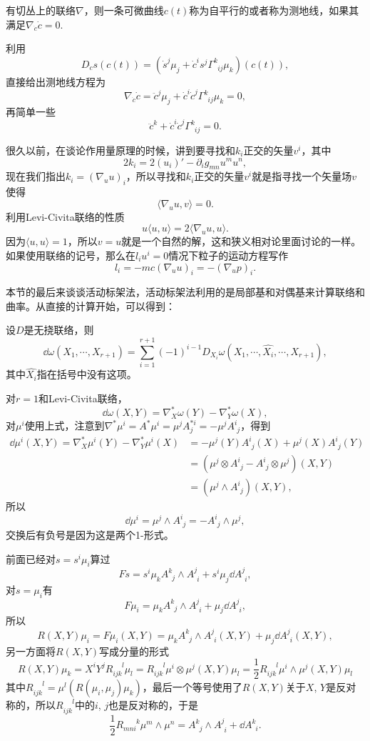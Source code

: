 \para 有切丛上的联络$\nabla$，则一条可微曲线$c(t)$称为自平行的或者称为测地线，如果其满足$\nabla_{\dot{c}}\dot{c}=0$.

利用
\[
D_{\dot{c}}s(c(t))=\left(\dot{s}^j\mu_j+\dot{c}^i s^j\Gamma^k_{\phantom{k}ij}\mu_k\right)(c(t)),
\]
直接给出测地线方程为
\[
\nabla_{\dot{c}}\dot{c}=\ddot{c}^j\mu_j+\dot{c}^i \dot{c}^j\Gamma^k_{\phantom{k}ij}\mu_k=0,
\]
再简单一些
\[
\ddot{c}^k+\dot{c}^i \dot{c}^j\Gamma^k_{\phantom{k}ij}=0.
\]

很久以前，在谈论作用量原理的时候，讲到要寻找和$k_i$正交的矢量$v^i$，其中
\[
	2k_i=2(u_i)'-\partial_ig_{mn}u^mu^n,
\]
现在我们指出$k_i=(\nabla_{u}u)_i$，所以寻找和$k_i$正交的矢量$v^i$就是指寻找一个矢量场$v$使得
\[
	\langle \nabla_{u}u,v\rangle=0.
\]
利用Levi-Civita联络的性质
\[
	u\langle u,u\rangle=2\langle \nabla_{u}u,u\rangle.
\]
因为$\langle u,u\rangle=1$，所以$v=u$就是一个自然的解，这和狭义相对论里面讨论的一样。如果使用联络的记号，那么在$l_iu^i=0$情况下粒子的运动方程写作
\[
	l_i=-mc(\nabla_{u}u)_i=-(\nabla_{u}p)_i.
\]

本节的最后来谈谈活动标架法，活动标架法利用的是局部基和对偶基来计算联络和曲率。从直接的计算开始，可以得到：

\pro 设$D$是无挠联络，则
\[
	\dd \omega(X_1,\cdots,X_{r+1})=\sum_{i=1}^{r+1}(-1)^{i-1}D_{X_i}\omega(X_1,\cdots,\hat{X_i},\cdots,X_{r+1}),
\]
其中$\hat{X_i}$指在括号中没有这项。

对$r=1$和Levi-Civita联络，
\[
	\dd \omega(X,Y)=\nabla^*_{X}\omega(Y)-\nabla^*_{Y}\omega(X),
\]
对$\mu^i$使用上式，注意到$\nabla^*\mu^i=A^*\mu^i=\mu^jA^{*i}_j=-\mu^jA^i_{\phantom{i}j}$，得到
\begin{align*}
	\dd \mu^i(X,Y)=\nabla^*_{X}\mu^i(Y)-\nabla^*_{Y}\mu^i(X)&=-\mu^j(Y)A^i_{\phantom{i}j}(X)+\mu^j(X)A^i_{\phantom{i}j}(Y)\\
	&=(\mu^j\otimes A^i_{\phantom{i}j}-A^i_{\phantom{i}j}\otimes \mu^j)(X,Y)\\
	&=(\mu^j\wedge A^i_{\phantom{i}j})(X,Y),
\end{align*}
所以
\begin{equation}
	\dd \mu^i=\mu^j\wedge A^i_{\phantom{i}j}=-A^i_{\phantom{i}j}\wedge \mu^j,
	\label{cartan1}
\end{equation}
交换后有负号是因为这是两个1-形式。

前面已经对$s=s^i\mu_i$算过
\[
	F s=s^i \mu_k A^{k}_{\phantom{k}j}\wedge A^{j}_{\phantom{j}i}+s^i\mu_j\dd A^{j}_{\phantom{j}i},
\]
对$s=\mu_i$有
\[
	F \mu_i=\mu_k A^{k}_{\phantom{k}j}\wedge A^{j}_{\phantom{j}i}+\mu_j\dd A^{j}_{\phantom{j}i},
\]
所以
\[
	R(X,Y) \mu_i=F \mu_i(X,Y)=\mu_k A^{k}_{\phantom{k}j}\wedge A^{j}_{\phantom{j}i}(X,Y)+\mu_j\dd A^{j}_{\phantom{j}i}(X,Y),
\]
另一方面将$R(X,Y)$写成分量的形式
\[
	R(X,Y) \mu_k=X^iY^jR_{ijk}^{\phantom{ijk}l}\mu_l=R_{ijk}^{\phantom{ijk}l} \mu^i\otimes\mu^j(X,Y)\mu_l=\frac{1}{2}R_{ijk}^{\phantom{ijk}l} \mu^i\wedge\mu^j(X,Y)\mu_l
\]
其中$R_{ijk}^{\phantom{ijk}l}=\mu^l(R(\mu_i,\mu_j)\mu_k)$，最后一个等号使用了$R(X,Y)$关于$X$, $Y$是反对称的，所以$R_{ijk}^{\phantom{ijk}l}$中的$i$, $j$也是反对称的，于是
\begin{equation}
	\frac{1}{2}R_{mni}^{\phantom{mni}k} \mu^m\wedge\mu^n=A^{k}_{\phantom{k}j}\wedge A^{j}_{\phantom{j}i}+\dd A^{k}_{\phantom{k}i}.
	\label{cartan2}
\end{equation}

